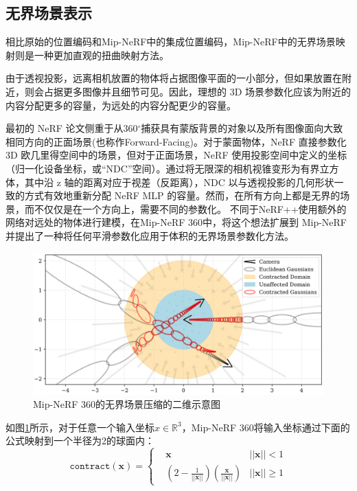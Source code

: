 \subsection{无界场景表示}
相比原始的位置编码和Mip-NeRF中的集成位置编码，Mip-NeRF中的无界场景映射则是一种更加直观的扭曲映射方法。

由于透视投影，远离相机放置的物体将占据图像平面的一小部分，但如果放置在附近，则会占据更多图像并且细节可见。因此，理想的 3D 场景参数化应该为附近的内容分配更多的容量，为远处的内容分配更少的容量。

最初的 NeRF 论文侧重于从360$^\circ$捕获具有蒙版背景的对象以及所有图像面向大致相同方向的正面场景(也称作Forward-Facing)。对于蒙面物体，NeRF 直接参数化 3D 欧几里得空间中的场景，但对于正面场景，NeRF 使用投影空间中定义的坐标（归一化设备坐标，或“NDC”空间）。通过将无限深的相机视锥变形为有界立方体，其中沿 z 轴的距离对应于视差（反距离），NDC 以与透视投影的几何形状一致的方式有效地重新分配 NeRF MLP 的容量。然而，在所有方向上都是无界的场景，而不仅仅是在一个方向上，需要不同的参数化。 不同于NeRF++\cite{zhang_nerf_2020}使用额外的网络对远处的物体进行建模，在Mip-NeRF 360\cite{barron_mip-nerf_2022}中，将这个想法扩展到 Mip-NeRF 并提出了一种将任何平滑参数化应用于体积的无界场景参数化方法。

\begin{figure}[ht]
    \centering
    \includegraphics[width=\textwidth]{undergraduate-thesis/images/related-work/mipnerf360-contraction.png}
    \caption{Mip-NeRF 360\cite{barron_mip-nerf_2022}的无界场景压缩的二维示意图}
    \label{fig:related-work-unbounded-contraction}
\end{figure}

如图\ref{fig:related-work-unbounded-contraction}所示，对于任意一个输入坐标$x\in\mathbb{R}^3$，Mip-NeRF 360将输入坐标通过下面的公式映射到一个半径为2的球面内：
\begin{equation}
    \mathtt{contract}(\mathbf{x}) = \left\{\begin{matrix}&\mathbf{x}&||\mathbf{x}||<1\\&(2-\frac{1}{||\mathbf{x}||})(\frac{\mathbf{x}}{||\mathbf{x}||})&||\mathbf{x}||\geq1\end{matrix}\right.
\end{equation}

